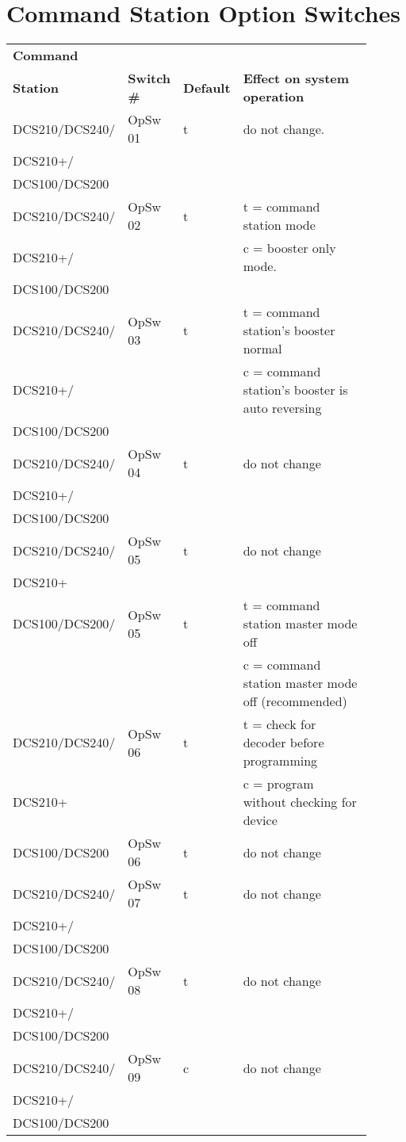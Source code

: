 \chapter{Command Station Option Switches}

\begin{tabular}{|p{0.2\linewidth}|p{0.125\linewidth}|p{0.1\linewidth}|p{0.475\linewidth}|} 
\hline
\textbf{Command} &&&\\
\textbf{Station} & \textbf{Switch \#} & \textbf{Default} & \textbf{Effect on system operation}\\
\hline
DCS210/DCS240/ & OpSw 01 & t & do not change.\\
DCS210+/ &&&\\
DCS100/DCS200 &&&\\
\hline
DCS210/DCS240/ & OpSw 02 & t & t = command station mode\\
DCS210+/ & & & c = booster only mode.\\
DCS100/DCS200 &&&\\
\hline
DCS210/DCS240/ & OpSw 03 & t & t = command station's booster normal\\
DCS210+/& & & c = command station's booster is auto reversing\\
DCS100/DCS200 &&&\\
\hline
DCS210/DCS240/ & OpSw 04 & t & do not change\\
DCS210+/ &&&\\
DCS100/DCS200 &&&\\
\hline
DCS210/DCS240/ & OpSw 05 & t & do not change\\
DCS210+ &&&\\
\hline
DCS100/DCS200/ & OpSw 05 & t & t = command station master mode off\\
&&& c = command station master mode off (recommended)\\
\hline
DCS210/DCS240/ & OpSw 06 & t & t = check for decoder before programming\\
DCS210+& & & c = program without checking for device\\ 
\hline
DCS100/DCS200 & OpSw 06 & t & do not change\\
\hline
DCS210/DCS240/ & OpSw 07 & t & do not change\\
DCS210+/ &&&\\
DCS100/DCS200 &&&\\
\hline
DCS210/DCS240/ & OpSw 08 & t & do not change\\
DCS210+/ &&&\\
DCS100/DCS200 &&&\\
\hline
DCS210/DCS240/ & OpSw 09 & c & do not change\\
DCS210+/ &&&\\
DCS100/DCS200 &&&\\
\hline
\end{tabular}
